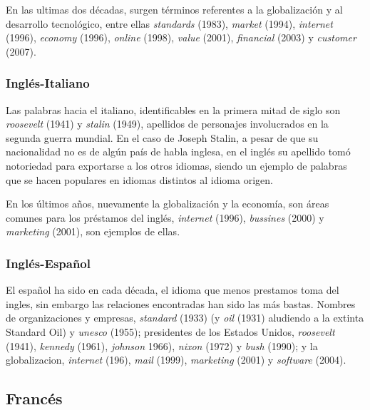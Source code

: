 En las ultimas dos décadas, surgen términos referentes a la globalización y al desarrollo tecnológico, entre ellas \textit{standards} (1983), \textit{market} (1994), \textit{internet} (1996), \textit{economy} (1996), \textit{online} (1998), \textit{value} (2001), \textit{financial} (2003) y \textit{customer} (2007). 

\subsubsection*{Inglés-Italiano} %


Las palabras hacia el italiano, identificables en la primera mitad de siglo son \textit{roosevelt} (1941) y \textit{stalin} (1949), apellidos de personajes involucrados en la segunda guerra mundial. En el caso de Joseph Stalin, a pesar de que su nacionalidad no es de algún país de habla inglesa, en el inglés su apellido tomó notoriedad para exportarse a los otros idiomas, siendo un ejemplo de palabras que se hacen populares en idiomas distintos al idioma origen. 

En los últimos años, nuevamente la globalización y la economía, son áreas comunes para los préstamos del inglés, \textit{internet} (1996), \textit{bussines} (2000) y \textit{marketing} (2001), son ejemplos de ellas. 


\subsubsection*{Inglés-Español} 

El español ha sido en cada década,  el idioma que menos prestamos toma del ingles, sin embargo las relaciones encontradas han sido las más bastas.  Nombres de organizaciones y empresas,  \textit{standard} (1933) (y \textit{oil} (1931) aludiendo a la extinta Standard Oil) y \textit{unesco} (1955);  presidentes de los Estados Unidos,  \textit{roosevelt} (1941), \textit{kennedy} (1961), \textit{johnson} 1966),  \textit{nixon} (1972) y \textit{bush} (1990); y la globalizacion, \textit{internet} (196), \textit{mail} (1999), \textit{marketing} (2001) y \textit{software} (2004).   


\subsection{Francés} %

